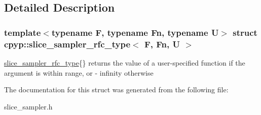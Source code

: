 \subsection{Detailed Description}
\subsubsection*{template$<$typename F, typename Fn, typename U$>$\newline
struct cpyp\+::slice\+\_\+sampler\+\_\+rfc\+\_\+type$<$ F, Fn, U $>$}

\mbox{\hyperlink{structcpyp_1_1slice__sampler__rfc__type}{slice\+\_\+sampler\+\_\+rfc\+\_\+type}}\{\} returns the value of a user-\/specified function if the argument is within range, or -\/ infinity otherwise 

The documentation for this struct was generated from the following file\+:\begin{DoxyCompactItemize}
\item 
slice\+\_\+sampler.\+h\end{DoxyCompactItemize}
